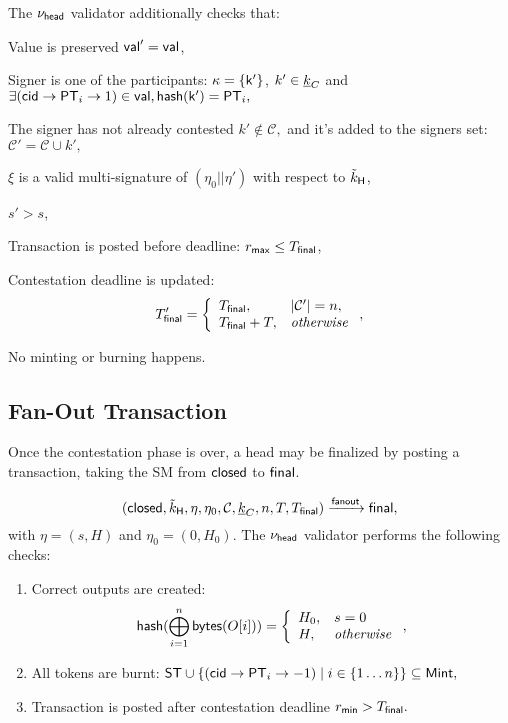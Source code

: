 \noindent The $\nu_\mathsf{head}$ validator additionally checks that:
\begin{menumerate}
  \item Value is preserved $\mathsf{val}' = \mathsf{val}$,
  \item Signer is one of the participants: $\kappa = \{\mathsf{k'}\}$, $k' \in \underline{k}_C$ and
    $
    \exists (\mathsf{cid} \rightarrow \mathsf{PT}_i \rightarrow 1) \in \mathsf{val}, \mathsf{hash}(\mathsf{k'}) = \mathsf{PT}_i,
    $
  \item The signer has not already contested $k' \not\in \mathcal{C},$  and it's added to the signers set: $\mathcal{C}' = \mathcal{C} \cup k',$
  \item $\xi$ is a valid multi-signature of $(\eta_0 || \eta')$ with respect to $\tilde{k}_{\mathsf{H}}$, 
  \item $s' > s$, 
  \item Transaction is posted before deadline: $r_{\mathsf{max}} \leq T_{\mathsf{final}}$,
  \item Contestation deadline is updated:
     $$
     T_{\mathsf{final}}' = 
        \left\{\begin{array}{ll}
             T_{\mathsf{final}},     &  |\mathcal{C}'| = n, \\
             T_{\mathsf{final}} + T, &  \mathit{otherwise} \\
        \end{array}\right.,
     $$
  \item No minting or burning happens.
\end{menumerate}


\subsection{Fan-Out Transaction}



Once the contestation phase is over, a head
may be finalized by posting a \mtxFanout{} transaction, taking the SM
from $\mathsf{closed}$ to $\mathsf{final}$.  

$$
   (\mathsf{closed},\tilde{k}_{\mathsf{H}},\eta,\eta_0,\mathcal{C},\underline{k}_C,n,T,T_{\mathsf{final}}) \xrightarrow{\mathsf{fanout}} \mathsf{final},
$$
with $\eta = (s, H)$ and $\eta_0 = (0, H_0).$
The $\nu_\mathsf{head}$ validator performs the following checks:
\begin{enumerate}
  \item Correct outputs are created: 
  $$
  \mathsf{hash}(\bigoplus_{i=1}^n \mathsf{bytes}(O[i])) = 
    \left\{
    \begin{array}{ll}
        H_0, & s = 0 \\
        H, &\mathit{otherwise}
    \end{array}
    \right.,
  $$
  \item All tokens are burnt: 
     $\mathsf{ST} \cup \{(\mathsf{cid} \rightarrow \mathsf{PT}_i \rightarrow -1) \mid i \in \{1\dots n\}\} \subseteq \mathsf{Mint},$
  \item Transaction is posted after contestation deadline $r_{\mathsf{min}} > T_{\mathsf{final}}.$
\end{enumerate}

